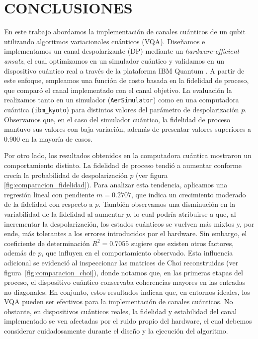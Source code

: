 \documentclass[letterpaper,12pt]{thesisECFM}
\theoremstyle{plain}
\theoremstyle{definition}
\theoremstyle{definition}
\theoremstyle{remark}
\newcommand{\1}{\mathbb{1}}
\begin{document}
\backmatter
\chapter{CONCLUSIONES} %
En este trabajo abordamos la implementación de canales cuánticos de un qubit utilizando algoritmos variacionales cuánticos (VQA). Diseñamos e implementamos un canal despolarizante (DP) mediante un \textit{hardware-efficient} \textit{ansatz}, el cual optimizamos en un simulador cuántico y validamos en un dispositivo cuántico real a través de la plataforma IBM Quantum \cite{VQA, ibm_quantum_resources}. A partir de este enfoque, empleamos una función de costo basada en la fidelidad de proceso, que comparó el canal implementado con el canal objetivo. La evaluación la realizamos tanto en un simulador (\texttt{AerSimulator}) como en una computadora cuántica (\texttt{ibm\_kyoto}) para distintos valores del parámetro de despolarización $p$. Observamos que, en el caso del simulador cuántico, la fidelidad de proceso mantuvo sus valores con baja variación, además de presentar valores superiores a 0.900 en la mayoría de casos. 

Por otro lado, los resultados obtenidos en la computadora cuántica mostraron un comportamiento distinto. La fidelidad de proceso tendió a aumentar conforme crecía la probabilidad de despolarización $p$ (ver figura \ref{fig:comparacion_fidelidad}). Para analizar esta tendencia, aplicamos una regresión lineal con pendiente $m = 0.2707$, que indica un crecimiento moderado de la fidelidad con respecto a $p$. También observamos una disminución en la variabilidad de la fidelidad al aumentar $p$, lo cual podría atribuirse a que, al incrementar la despolarización, los estados cuánticos se vuelven más mixtos y, por ende, más tolerantes a los errores introducidos por el hardware. Sin embargo, el coeficiente de determinación $R^2 = 0.7055$ sugiere que existen otros factores, además de $p$, que influyen en el comportamiento observado. Esta influencia adicional se evidenció al inspeccionar las matrices de Choi reconstruidas (ver figura~\ref{fig:comparacion_choi}), donde notamos que, en las primeras etapas del proceso, el dispositivo cuántico conservaba coherencias mayores en las entradas no diagonales. En conjunto, estos resultados indican que, en entornos ideales, los VQA pueden ser efectivos para la implementación de canales cuánticos. No obstante, en dispositivos cuánticos reales, la fidelidad y estabilidad del canal implementado se ven afectadas por el ruido propio del hardware, el cual debemos considerar cuidadosamente durante el diseño y la ejecución del algoritmo.
\end{document}
